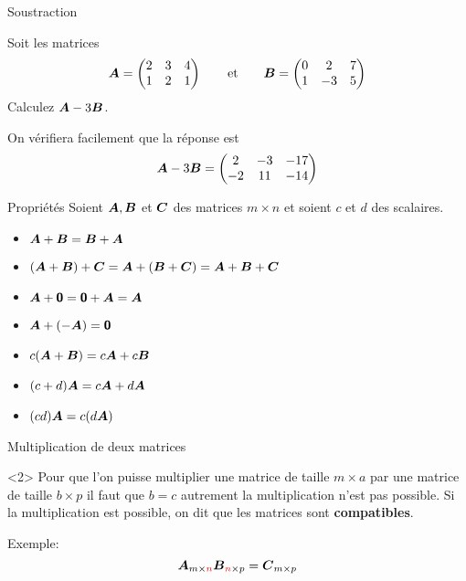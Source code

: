 \documentclass[french, handout]{beamer}
\begin{document}
\begin{frame}{Soustraction}
\begin{example}
    Soit les matrices
    \[
    \boldsymbol{A} = \begin{pmatrix}
        2 & 3 & 4 \\
        1 & 2 & 1
        \end{pmatrix}
    \qquad \mbox{et} \qquad
    \boldsymbol{B} = \begin{pmatrix}
        0 & 2 & 7 \\
        1 & -3 & 5
        \end{pmatrix}
    \]
    Calculez $\boldsymbol{A}-3\boldsymbol{B}$.
\end{example}
    On vérifiera facilement que la réponse est
    \[
    \boldsymbol{A} - 3\boldsymbol{B} = \begin{pmatrix}
            2 & -3 & -17 \\
            -2 & 11 & -14
            \end{pmatrix}
    \]
\end{frame}

\begin{frame}{Propriétés}
Soient $\boldsymbol{A}, \boldsymbol{B}$ et $\boldsymbol{C}$ des matrices $m\times n$ et soient $c$ et $d$ des
scalaires.
\begin{itemize}[<+-|alert@+>]
\item $\boldsymbol{A} + \boldsymbol{B} = \boldsymbol{B} + \boldsymbol{A}$ 
\item $(\boldsymbol{A} + \boldsymbol{B}) + \boldsymbol{C} = \boldsymbol{A} + (\boldsymbol{B} + \boldsymbol{C}) = \boldsymbol{A} + \boldsymbol{B} + \boldsymbol{C}$ 
\item $\boldsymbol{A} + \mbox{\textsf{\textbf{{0}}}} = \mbox{\textsf{\textbf{{0}}}} + \boldsymbol{A} = \boldsymbol{A}$ 
\item $\boldsymbol{A} + (-\boldsymbol{A}) = \mbox{\textsf{\textbf{{0}}}}$ 
\item $c(\boldsymbol{A}+\boldsymbol{B}) = c\boldsymbol{A} + c\boldsymbol{B}$ 
\item $(c+d) \boldsymbol{A} = c\boldsymbol{A} + d\boldsymbol{A}$ 
\item $(cd) \boldsymbol{A} = c (d\boldsymbol{A})$ 
\end{itemize}

\end{frame}


\begin{frame}{Multiplication de deux matrices}
\begin{block}{}<2>
Pour que l'on puisse multiplier une matrice de taille $m\times a$ 
par une matrice
de taille $b\times p$
 il faut que $b=c$ autrement la multiplication n'est pas possible.  
Si la multiplication est possible, on dit que les matrices sont \textbf{compatibles}.

Exemple:\huge
\[
\boldsymbol{A}_{m\times \textcolor{red}{n}} \boldsymbol{B}_{\textcolor{red}{n}\times p} = \boldsymbol{C}_{m\times p}
\]
\end{block}

\end{frame}
\end{document}
